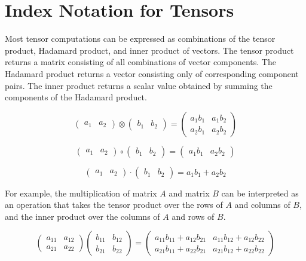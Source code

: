\section{Index Notation for Tensors}

Most tensor computations can be expressed as combinations of the tensor product, Hadamard product, and inner product of vectors.
The tensor product returns a matrix consisting of all combinations of vector components.
The Hadamard product returns a vector consisting only of corresponding component pairs.
The inner product returns a scalar value obtained by summing the components of the Hadamard product.

$$
\begin{pmatrix}
a_{1} & a_{2}
\end{pmatrix}
\otimes
\begin{pmatrix}
b_{1} & b_{2}
\end{pmatrix}
=
\begin{pmatrix}
a_{1} b_{1} & a_{1} b_{2} \\
a_{2} b_{1} & a_{2} b_{2}
\end{pmatrix}
$$

$$
\begin{pmatrix}
a_{1} & a_{2}
\end{pmatrix}
\circ
\begin{pmatrix}
b_{1} & b_{2}
\end{pmatrix}
=
\begin{pmatrix}
a_{1} b_{1} & a_{2} b_{2}
\end{pmatrix}
$$

$$
\begin{pmatrix}
a_{1} & a_{2}
\end{pmatrix}
\cdot
\begin{pmatrix}
b_{1} & b_{2}
\end{pmatrix}
=
a_{1} b_{1} + a_{2} b_{2}
$$

For example, the multiplication of matrix $A$ and matrix $B$ can be interpreted as an operation that takes the tensor product over the rows of $A$ and columns of $B$, and the inner product over the columns of $A$ and rows of $B$.

$$
\begin{pmatrix}
a_{11} & a_{12} \\
a_{21} & a_{22}
\end{pmatrix}
\begin{pmatrix}
b_{11} & b_{12} \\
b_{21} & b_{22}
\end{pmatrix}
=
\begin{pmatrix}
a_{11} b_{11} + a_{12} b_{21} & a_{11} b_{12} + a_{12} b_{22} \\
a_{21} b_{11} + a_{22} b_{21} & a_{21} b_{12} + a_{22} b_{22}
\end{pmatrix}
$$

